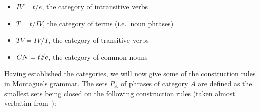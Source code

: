 \begin{itemize}
\item $IV = t / e$, the category of intransitive verbs
\item $T = t / IV$, the category of terms (i.e.\ noun phrases)
\item $TV = IV / T$, the category of transitive verbs
\item $CN = t /\!\!/ e$, the category of common nouns
\end{itemize}

Having established the categories, we will now give some of the
construction rules in Montague's grammar. The sets $P_A$ of phrases of
category $A$ are defined as the smallest sets being closed on the following
construction rules (taken almost verbatim from~\cite{montague1973proper}):


